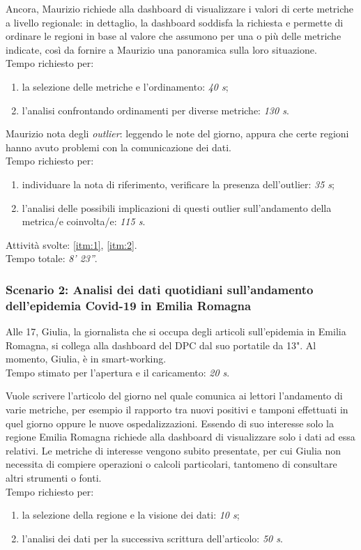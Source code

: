 Ancora, Maurizio richiede alla dashboard di visualizzare i valori di certe metriche a livello regionale: in dettaglio, la dashboard soddisfa la richiesta e permette di ordinare le regioni in base al valore che assumono per una o più delle metriche indicate, così da fornire a Maurizio una panoramica sulla loro situazione.\\
Tempo richiesto per:
\begin{enumerate}
    \item la selezione delle metriche e l'ordinamento: \textit{40 s};
    \item l'analisi confrontando ordinamenti per diverse metriche: \textit{130 s}.
\end{enumerate}

Maurizio nota degli \textit{outlier}:  leggendo le note del giorno, appura che certe regioni hanno avuto problemi con la comunicazione dei dati.\\
Tempo richiesto per:
\begin{enumerate}
    \item individuare la nota di riferimento, verificare la presenza dell'outlier: \textit{35 s};
    \item l'analisi delle possibili implicazioni di questi outlier sull'andamento della metrica/e coinvolta/e: \textit{115 s}.
\end{enumerate}
\noindent
Attività svolte: \ref{itm:1}, \ref{itm:2}.\\ 
Tempo totale: \textit{8' 23''}. 

\subsubsection*{Scenario 2: Analisi dei dati quotidiani sull'andamento dell'epidemia Covid-19 in Emilia Romagna}
Alle 17, Giulia, la giornalista che si occupa degli articoli sull'epidemia in Emilia Romagna, si collega alla dashboard del DPC dal suo portatile da 13". Al momento, Giulia, è in smart-working.\\
Tempo stimato per l'apertura e il caricamento: \textit{20 s}. 

Vuole scrivere l'articolo del giorno nel quale comunica ai lettori l'andamento di varie metriche, per esempio il rapporto tra nuovi positivi e tamponi effettuati in quel giorno oppure le nuove ospedalizzazioni. Essendo di suo interesse solo la regione Emilia Romagna richiede alla dashboard di visualizzare solo i dati ad essa relativi. Le metriche di interesse vengono subito presentate, per cui Giulia non necessita di compiere operazioni o calcoli particolari, tantomeno di consultare altri strumenti o fonti.\\
Tempo richiesto per:
\begin{enumerate}
    \item la selezione della regione e la visione dei dati: \textit{10 s};
    \item l'analisi dei dati per la successiva scrittura dell'articolo: \textit{50 s}.
\end{enumerate}

